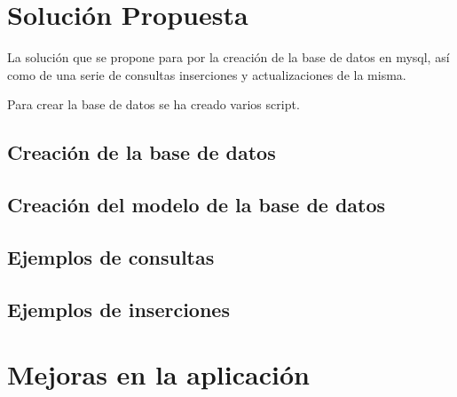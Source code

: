 \documentclass[a4paper]{article}
\begin{document}
	\section{Solución Propuesta}\label{solucion}
	La solución que se propone para por la creación de la base de datos en mysql, así como de una serie de consultas inserciones y actualizaciones de la misma.
	
	Para crear la base de datos se ha creado varios script.
	\subsection{Creación de la base de datos}
	
	\subsection{Creación del modelo de la base de datos}
	
	
	\subsection{Ejemplos de consultas}
	
	
	\subsection{Ejemplos de inserciones}
	
% 	
	
	\section{Mejoras en la aplicación}\label{mejoras}
	
\end{document}
